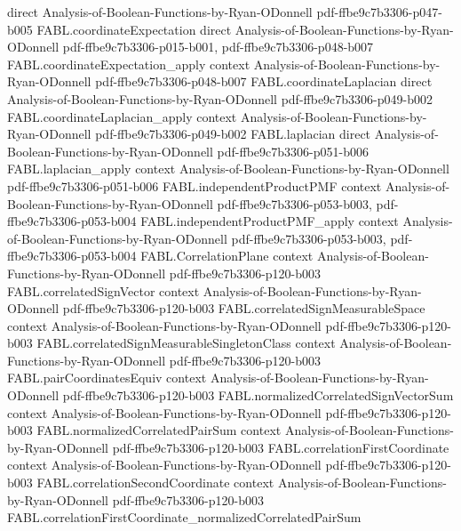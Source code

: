 \begin{theorem}
  {direct}
  {Analysis-of-Boolean-Functions-by-Ryan-ODonnell}
  {pdf-ffbe9c7b3306-p047-b005}
\proofstep
  {FABL.coordinateExpectation}
  {direct}
  {Analysis-of-Boolean-Functions-by-Ryan-ODonnell}
  {pdf-ffbe9c7b3306-p015-b001,
    pdf-ffbe9c7b3306-p048-b007}
\proofstep
  {FABL.coordinateExpectation_apply}
  {context}
  {Analysis-of-Boolean-Functions-by-Ryan-ODonnell}
  {pdf-ffbe9c7b3306-p048-b007}
\proofstep
  {FABL.coordinateLaplacian}
  {direct}
  {Analysis-of-Boolean-Functions-by-Ryan-ODonnell}
  {pdf-ffbe9c7b3306-p049-b002}
\proofstep
  {FABL.coordinateLaplacian_apply}
  {context}
  {Analysis-of-Boolean-Functions-by-Ryan-ODonnell}
  {pdf-ffbe9c7b3306-p049-b002}
\proofstep
  {FABL.laplacian}
  {direct}
  {Analysis-of-Boolean-Functions-by-Ryan-ODonnell}
  {pdf-ffbe9c7b3306-p051-b006}
\proofstep
  {FABL.laplacian_apply}
  {context}
  {Analysis-of-Boolean-Functions-by-Ryan-ODonnell}
  {pdf-ffbe9c7b3306-p051-b006}
\proofstep
  {FABL.independentProductPMF}
  {context}
  {Analysis-of-Boolean-Functions-by-Ryan-ODonnell}
  {pdf-ffbe9c7b3306-p053-b003,
    pdf-ffbe9c7b3306-p053-b004}
\proofstep
  {FABL.independentProductPMF_apply}
  {context}
  {Analysis-of-Boolean-Functions-by-Ryan-ODonnell}
  {pdf-ffbe9c7b3306-p053-b003,
    pdf-ffbe9c7b3306-p053-b004}
\proofstep
  {FABL.CorrelationPlane}
  {context}
  {Analysis-of-Boolean-Functions-by-Ryan-ODonnell}
  {pdf-ffbe9c7b3306-p120-b003}
\proofstep
  {FABL.correlatedSignVector}
  {context}
  {Analysis-of-Boolean-Functions-by-Ryan-ODonnell}
  {pdf-ffbe9c7b3306-p120-b003}
\proofstep
  {FABL.correlatedSignMeasurableSpace}
  {context}
  {Analysis-of-Boolean-Functions-by-Ryan-ODonnell}
  {pdf-ffbe9c7b3306-p120-b003}
\proofstep
  {FABL.correlatedSignMeasurableSingletonClass}
  {context}
  {Analysis-of-Boolean-Functions-by-Ryan-ODonnell}
  {pdf-ffbe9c7b3306-p120-b003}
\proofstep
  {FABL.pairCoordinatesEquiv}
  {context}
  {Analysis-of-Boolean-Functions-by-Ryan-ODonnell}
  {pdf-ffbe9c7b3306-p120-b003}
\proofstep
  {FABL.normalizedCorrelatedSignVectorSum}
  {context}
  {Analysis-of-Boolean-Functions-by-Ryan-ODonnell}
  {pdf-ffbe9c7b3306-p120-b003}
\proofstep
  {FABL.normalizedCorrelatedPairSum}
  {context}
  {Analysis-of-Boolean-Functions-by-Ryan-ODonnell}
  {pdf-ffbe9c7b3306-p120-b003}
\proofstep
  {FABL.correlationFirstCoordinate}
  {context}
  {Analysis-of-Boolean-Functions-by-Ryan-ODonnell}
  {pdf-ffbe9c7b3306-p120-b003}
\proofstep
  {FABL.correlationSecondCoordinate}
  {context}
  {Analysis-of-Boolean-Functions-by-Ryan-ODonnell}
  {pdf-ffbe9c7b3306-p120-b003}
\proofstep
  {FABL.correlationFirstCoordinate_normalizedCorrelatedPairSum}

\end{theorem}
